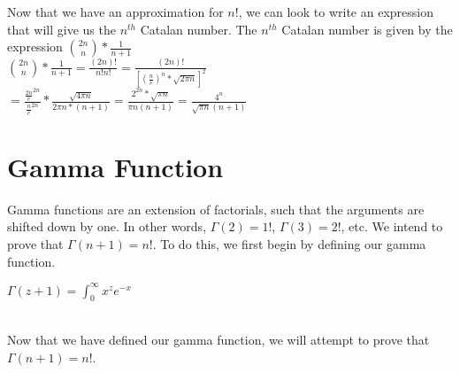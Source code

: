 \documentclass[11pt,twosided]{article}
\begin{document}
Now that we have an approximation for $n!$, we can look to write an expression that will give us the $n^{th}$ Catalan number. The $n^{th}$ Catalan number is given by the expression ${2n \choose n}*\frac{1}{n+1}$\\
${2n \choose n}*\frac{1}{n+1} = \frac{(2n)!}{n!n!} = \frac{(2n)!}{[(\frac{n}{e})^n * \sqrt{2\pi n}]^2}$\\
$= \frac{\frac{2n}{e}^{2n}}{\frac{n}{e}^{2n}} * \frac{\sqrt{4\pi n}}{2\pi n * (n+1)} = \frac{2^{2n}*\sqrt{\pi n}}{\pi n(n+1)} = \frac{4^n}{\sqrt{\pi n}(n+1)}$

\section{Gamma Function}
Gamma functions are an extension of factorials, such that the arguments are shifted down by one. In other words, $\Gamma(2) = 1!$, $\Gamma(3) = 2!$, etc. We intend to prove that $\Gamma(n+1) = n!$. To do this, we first begin by defining our gamma function.\\
\begin{definition}
    $\Gamma(z+1)=\int_{0}^{\infty} {x^{z}e^{-x}}$
\end{definition}\\
Now that we have defined our gamma function, we will attempt to prove that $\Gamma(n+1) = n!$.\\
\end{document}
